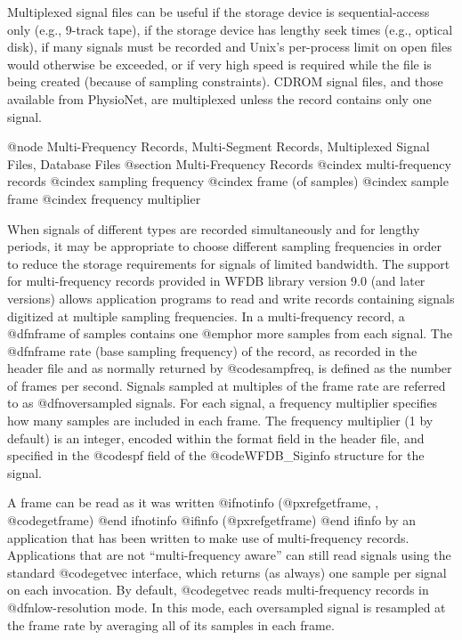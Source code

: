 {{{{{{{{{Multiplexed signal files can be useful if the storage device is
sequential-access only (e.g., 9-track tape), if the storage device has lengthy
seek times (e.g., optical disk), if many signals must be recorded and Unix's
per-process limit on open files would otherwise be exceeded, or if very high
speed is required while the file is being created (because of sampling
constraints).  CDROM signal files, and those available from PhysioNet, are
multiplexed unless the record contains only one signal.

@node     Multi-Frequency Records, Multi-Segment Records, Multiplexed Signal Files, Database Files
@section Multi-Frequency Records
@cindex multi-frequency records
@cindex sampling frequency
@cindex frame (of samples)
@cindex sample frame
@cindex frequency multiplier

When signals of different types are recorded simultaneously and for
lengthy periods, it may be appropriate to choose different sampling
frequencies in order to reduce the storage requirements for signals of
limited bandwidth.  The support for multi-frequency records provided in
WFDB library version 9.0 (and later versions) allows application programs
to read and write records containing signals digitized at multiple
sampling frequencies.  In a multi-frequency record, a @dfn{frame} of
samples contains one @emph{or more} samples from each signal.  The
@dfn{frame rate} (base sampling frequency) of the record, as recorded in the
header file and as normally returned by @code{sampfreq}, is defined as
the number of frames per second.  Signals sampled at multiples of the
frame rate are referred to as @dfn{oversampled signals}.  For each signal, a
frequency multiplier specifies how many samples are included in each
frame.  The frequency multiplier (1 by default) is an integer, encoded
within the format field in the header file, and specified in the
@code{spf} field of the @code{WFDB_Siginfo} structure for the signal.

A frame can be read as it was written
@ifnotinfo
(@pxref{getframe, , @code{getframe}})
@end ifnotinfo
@ifinfo
(@pxref{getframe})
@end ifinfo
by an application that has been written to make use of multi-frequency
records.  Applications that are not ``multi-frequency aware'' can still
read signals using the standard @code{getvec} interface, which returns
(as always) one sample per signal on each invocation.  By default,
@code{getvec} reads multi-frequency records in @dfn{low-resolution} mode.
In this mode, each oversampled signal is resampled at the frame rate by
averaging all of its samples in each frame.

}}}}}}}}}
